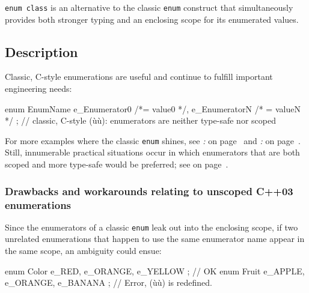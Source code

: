 
\texttt{enum}~\texttt{class} is an alternative to the classic
\texttt{enum} construct that simultaneously provides both stronger
typing and an enclosing scope for its enumerated values.

\subsection[Description]{Description}\label{description-enumclass}

Classic, C-style enumerations are useful and continue to fulfill
important engineering needs:

\begin{emcppslisting}
enum EnumName { e_Enumerator0 /*= value0 */, e_EnumeratorN /* = valueN */ };
    // classic, C-style (ù{}ù): enumerators are neither type-safe nor scoped
\end{emcppslisting}

\noindent For more examples where the classic \texttt{enum} shines, see \textit{: } on page~\pageref{strong-typing-of-an-enum-class-can-be-counterproductive} and \textit{: } on page~\pageref{scoped-enumerations-do-not-necessarily-add-value}. Still,
innumerable practical situations occur in which enumerators that are
both scoped and more type-safe would be preferred; see \textit{} on page~\pageref{introducing-the-c++11-enum-class}.

\subsubsection[Drawbacks and workarounds relating to unscoped C++03 enumerations]{Drawbacks and workarounds relating to unscoped C++03 enumerations}\label{drawbacks-and-workarounds-relating-to-unscoped-c++03-enumerations}

Since the enumerators of a classic \texttt{enum} leak out into the
enclosing scope, if two unrelated enumerations that happen to use the
same enumerator name appear in the same scope, an ambiguity could ensue:

\begin{emcppslisting}
enum Color { e_RED, e_ORANGE, e_YELLOW };    // OK
enum Fruit { e_APPLE, e_ORANGE, e_BANANA };  // Error, (ù{}ù) is redefined.
\end{emcppslisting}

